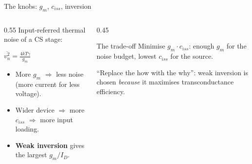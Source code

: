 \documentclass[aspectratio=169,9pt]{beamer}
\begin{document}
\begin{frame}{The knobs: $g_m$, $c_{iss}$, inversion}
  \begin{columns}[T]
    \begin{column}{0.55\textwidth}
      Input-referred thermal noise of a CS stage:
      \begin{resultbox}$\displaystyle \overline{v_n^2}=\frac{4kT\gamma}{g_m}$\end{resultbox}
      \begin{itemize}
        \item More $g_m$ $\Rightarrow$ less noise (more current for less voltage).
        \item Wider device $\Rightarrow$ more $c_{iss}$ $\Rightarrow$ more input loading.
        \item \textbf{Weak inversion} gives the largest $g_m/I_D$.
      \end{itemize}
    \end{column}
    \begin{column}{0.45\textwidth}
      \begin{block}{The trade-off}
        Minimise $g_m\cdot c_{iss}$: enough $g_m$ for the noise budget, lowest $c_{iss}$ for the
        source.
      \end{block}
      \begin{antoonbox}
      ``Replace the how with the why'': weak inversion is chosen \emph{because} it maximises
      transconductance efficiency.
      \end{antoonbox}
    \end{column}
  \end{columns}
\end{frame}
\end{document}

